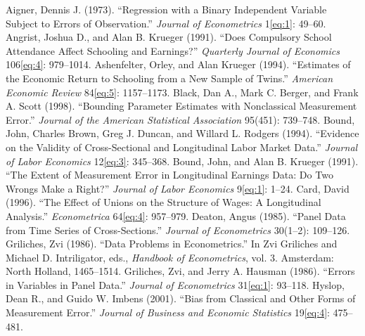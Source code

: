 \documentclass[12pt]{article}
\begin{document}

\begin{thebibliography}{99}
Aigner, Dennis J. (1973). ``Regression with a Binary Independent Variable Subject to Errors of Observation.'' \textit{Journal of Econometrics} 1\eqref{eq:1}: 49--60.
Angrist, Joshua D., and Alan B. Krueger (1991). ``Does Compulsory School Attendance Affect Schooling and Earnings?'' \textit{Quarterly Journal of Economics} 106\eqref{eq:4}: 979--1014.
Ashenfelter, Orley, and Alan Krueger (1994). ``Estimates of the Economic Return to Schooling from a New Sample of Twins.'' \textit{American Economic Review} 84\eqref{eq:5}: 1157--1173.
Black, Dan A., Mark C. Berger, and Frank A. Scott (1998). ``Bounding Parameter Estimates with Nonclassical Measurement Error.'' \textit{Journal of the American Statistical Association} 95(451): 739--748.
Bound, John, Charles Brown, Greg J. Duncan, and Willard L. Rodgers (1994). ``Evidence on the Validity of Cross-Sectional and Longitudinal Labor Market Data.'' \textit{Journal of Labor Economics} 12\eqref{eq:3}: 345--368.
Bound, John, and Alan B. Krueger (1991). ``The Extent of Measurement Error in Longitudinal Earnings Data: Do Two Wrongs Make a Right?'' \textit{Journal of Labor Economics} 9\eqref{eq:1}: 1--24.
Card, David (1996). ``The Effect of Unions on the Structure of Wages: A Longitudinal Analysis.'' \textit{Econometrica} 64\eqref{eq:4}: 957--979.
Deaton, Angus (1985). ``Panel Data from Time Series of Cross-Sections.'' \textit{Journal of Econometrics} 30(1--2): 109--126.
Griliches, Zvi (1986). ``Data Problems in Econometrics.'' In Zvi Griliches and Michael D. Intriligator, eds., \textit{Handbook of Econometrics}, vol. 3. Amsterdam: North Holland, 1465--1514.
Griliches, Zvi, and Jerry A. Hausman (1986). ``Errors in Variables in Panel Data.'' \textit{Journal of Econometrics} 31\eqref{eq:1}: 93--118.
Hyslop, Dean R., and Guido W. Imbens (2001). ``Bias from Classical and Other Forms of Measurement Error.'' \textit{Journal of Business and Economic Statistics} 19\eqref{eq:4}: 475--481.

\end{thebibliography}
\end{document}
